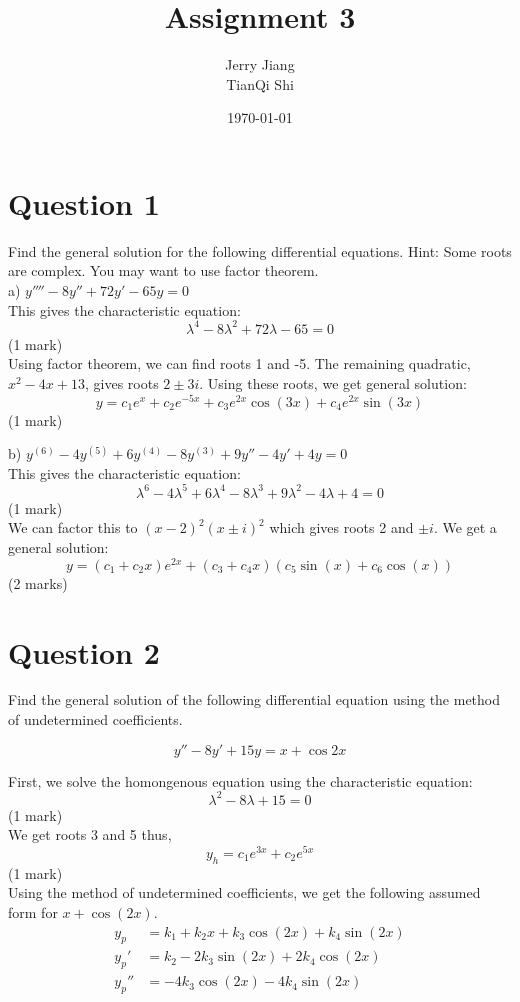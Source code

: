 \documentclass[titlepage,12pt]{article}
\title{Assignment 3}
\date{\today}
\author{Jerry Jiang\\ TianQi Shi}
\begin{document}
\maketitle

\section*{Question 1}

Find the general solution for the following differential equations. Hint: Some roots are complex. You may want to use factor theorem. \\

\noindent
a) $y'''' - 8y'' + 72y' - 65y = 0$ \\

\noindent This gives the characteristic equation:
$$\lambda^4 - 8\lambda^2 + 72\lambda - 65 = 0$$ \hfill (1 mark)
\\ Using factor theorem, we can find roots 1 and -5. The remaining quadratic, $x^2 - 4x + 13$, gives roots $2\pm3i$. Using these roots, we get general solution:
$$y = c_1 e^x + c_2e^{-5x} + c_3e^{2x}\cos(3x) + c_4 e^{2x}\sin(3x)$$ \hfill (1 mark)


\noindent
b) $y^{(6)} - 4y^{(5)} + 6y^{(4)} - 8y^{(3)} + 9y'' - 4y' + 4y = 0$ \\

\noindent This gives the characteristic equation:
$$\lambda^6 - 4\lambda^5 + 6\lambda^4 - 8\lambda^3 + 9\lambda^2 - 4\lambda + 4 = 0$$ \hfill (1 mark)
\\ We can factor this to $(x-2)^2(x\pm i)^2$ which gives roots 2 and $\pm i$. We get a general solution:
$$y=(c_1 + c_2x) e^{2x} + (c_3 + c_4x)(c_5\sin(x) + c_6\cos(x))$$ \hfill (2 marks)

\section*{Question 2}

Find the general solution of the following differential equation using the method of undetermined coefficients.

$$y'' - 8y' + 15y = x + \cos 2x$$

\noindent First, we solve the homongenous equation using the characteristic equation:
$$\lambda^2 - 8\lambda + 15 = 0$$ \hfill (1 mark)
\\ We get roots 3 and 5 thus,
$$y_h = c_1 e^{3x} + c_2 e^{5x}$$ \hfill (1 mark)
\\ Using the method of undetermined coefficients, we get the following assumed form for $x + \cos(2x)$.
\begin{align*}
y_p &= k_1 + k_2x + k_3\cos(2x) + k_4\sin(2x)
\\ y_p' &= k_2 - 2k_3\sin(2x) + 2k_4\cos(2x)
\\ y_p'' &= -4k_3\cos(2x) - 4k_4\sin(2x) \tag{1 mark}
\end{align*}
\end{document}
